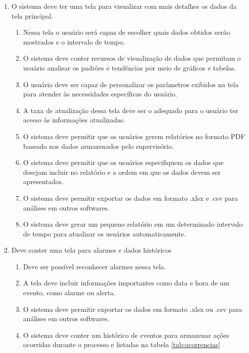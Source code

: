 \documentclass[a4paper,12pt]{article}
\begin{document}
\begin{enumerate}
    \item O sistema deve ter uma tela para visualizar com mais detalhes os dados da tela principal. 
        \begin{enumerate}
            \item Nessa tela o usuário será capaz de escolher quais dados obtidos serão mostrados e o intervalo de tempo.
             \item O sistema deve conter recursos de visualização de dados que permitam o usuário analisar os padrões e tendências por meio de gráficos e tabelas.
            \item  O usuário deve ser capaz de personalizar os parâmetros exibidos na tela para atender às necessidades específicas do usuário.
            \item A taxa de atualização dessa tela deve ser o adequado para o usuário ter acesso às informações atualizadas.
             \item O sistema deve permitir que os usuários gerem relatórios no formato PDF baseado nos dados armazenados pelo supervisório.
             \item O sistema deve permitir que os usuários especifiquem os dados que desejam incluir no relatório e a ordem em que os dados devem ser apresentados.
            \item O sistema deve permitir exportar os dados em formato .xlsx e .csv para análises em outros softwares.
            \item O sistema deve gerar um pequeno relatório em um determinado intervalo de tempo para atualizar os usuários automaticamente.
        \end{enumerate}
        
    \item Deve conter uma tela para alarmes e dados históricos 
        \begin{enumerate}
            \item Deve ser possível reconhecer alarmes nessa tela.
            \item A tela deve incluir informações importantes como data e hora de um evento, como alarme ou alerta.
            \item O sistema deve permitir exportar os dados em formato .xlsx ou .csv para análises em outros softwares.
             \item O sistema deve conter um histórico de eventos  para armazenar ações ocorridas durante o processo e listadas na tabela \ref{tab:ocorrencias}
        \end{enumerate}


\end{enumerate}
\end{document}

